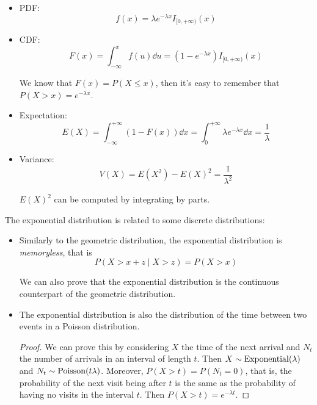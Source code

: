 \documentclass[12pt]{extarticle}
\newcommand{\Poisson}{{\operatorfont Poisson}}
\newcommand{\Exponential}{{\operatorfont Exponential}}
\begin{document}
\begin{itemize}
    \item PDF:
          \begin{equation}
              f(x) = \lambda e^{-\lambda x} I_{[0, +\infty)}(x)
          \end{equation}
    \item CDF:
          \begin{equation}
              F(x) = \int_{-\infty}^x f(u) \dd{u} = (1 - e^{-\lambda x})I_{[0, +\infty)}(x)
          \end{equation}

          We know that $F(x) = P(X \leq x)$, then it's easy to remember that $P(X > x) = e^{-\lambda x}$.
    \item Expectation:
          \begin{equation}
              E(X) = \int_{-\infty}^{+\infty} (1 - F(x)) \dd{x} = \int_0^{+\infty} \lambda e^{-\lambda x} \dd{x} = \frac{1}{\lambda}
          \end{equation}
    \item Variance:
          \begin{equation}
              V(X) = E(X^2) - E(X)^2 = \frac{1}{\lambda^2}
          \end{equation}

          $E(X)^2$ can be computed by integrating by parts.
\end{itemize}

The exponential distribution is related to some discrete distributions:
\begin{itemize}
    \item Similarly to the geometric distribution, the exponential distribution is \emph{memoryless}, that is
          \begin{equation}
              P(X > x + z \mid X > z) = P(X > x)
          \end{equation}

          We can also prove that the exponential distribution is the continuous counterpart of the geometric distribution.

    \item
          The exponential distribution is also the distribution of the time between two events in a Poisson distribution.

          \begin{proof}
              We can prove this by considering $X$ the time of the next arrival and $N_t$ the number of arrivals in an interval of length $t$.
              Then $X \sim \Exponential(\lambda)$ and $N_t \sim \Poisson(t \lambda)$.
              Moreover, $P(X > t) = P(N_t = 0)$, that is, the probability of the next visit being after $t$ is the same as the probability of having no visits in the interval $t$.
              Then $P(X > t) = e^{-\lambda t}$.
          \end{proof}
\end{itemize}
\end{document}
